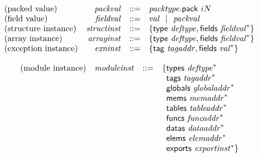 \vspace{1ex}

$$
\begin{array}[t]{@{}lrrl@{}l@{}}
\mbox{(packed value)} & {\mathit{packval}} & ::= & {\mathit{packtype}}{.}\mathsf{pack}~{i}{N} \\
\mbox{(field value)} & {\mathit{fieldval}} & ::= & {\mathit{val}} ~~|~~ {\mathit{packval}} \\
\mbox{(structure instance)} & {\mathit{structinst}} & ::= & \{ \begin{array}[t]{@{}l@{}l@{}}
\mathsf{type}~{\mathit{deftype}} ,  \mathsf{fields}~{{\mathit{fieldval}}^\ast} \} \\
\end{array} \\
\mbox{(array instance)} & {\mathit{arrayinst}} & ::= & \{ \begin{array}[t]{@{}l@{}l@{}}
\mathsf{type}~{\mathit{deftype}} ,  \mathsf{fields}~{{\mathit{fieldval}}^\ast} \} \\
\end{array} \\
\mbox{(exception instance)} & {\mathit{exninst}} & ::= & \{ \begin{array}[t]{@{}l@{}l@{}}
\mathsf{tag}~{\mathit{tagaddr}} ,  \mathsf{fields}~{{\mathit{val}}^\ast} \} \\
\end{array} \\
\end{array}
$$

\vspace{1ex}

$$
\begin{array}[t]{@{}lrrl@{}l@{}}
\mbox{(module instance)} & {\mathit{moduleinst}} & ::= & \{ \begin{array}[t]{@{}l@{}l@{}}
\mathsf{types}~{{\mathit{deftype}}^\ast} \\
\mathsf{tags}~{{\mathit{tagaddr}}^\ast} \\
\mathsf{globals}~{{\mathit{globaladdr}}^\ast} \\
\mathsf{mems}~{{\mathit{memaddr}}^\ast} \\
\mathsf{tables}~{{\mathit{tableaddr}}^\ast} \\
\mathsf{funcs}~{{\mathit{funcaddr}}^\ast} \\
\mathsf{datas}~{{\mathit{dataaddr}}^\ast} \\
\mathsf{elems}~{{\mathit{elemaddr}}^\ast} \\
\mathsf{exports}~{{\mathit{exportinst}}^\ast} \} \\
\end{array} \\
\end{array}
$$

